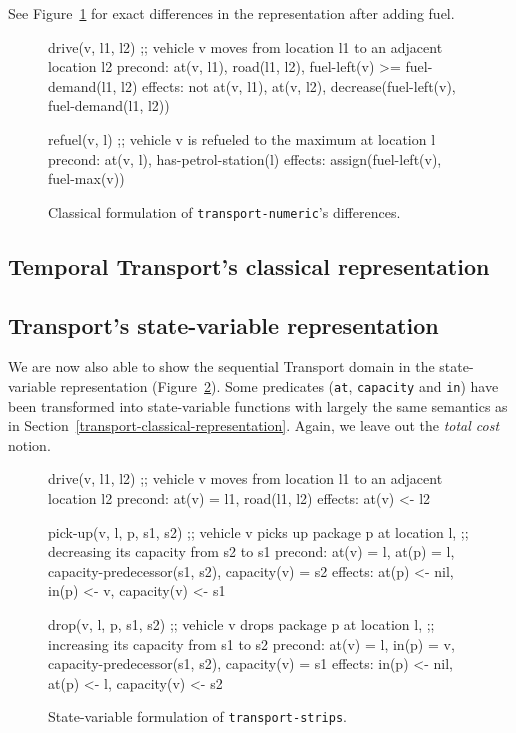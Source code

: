 See Figure~\ref{code:classical-numeric} for exact differences
in the representation after adding fuel.

\begin{figure}[htb]
\begin{code}
drive(v, l1, l2)
  ;; vehicle v moves from location l1 to an adjacent location l2
  precond: at(v, l1), road(l1, l2), fuel-left(v) >= fuel-demand(l1, l2)
  effects: not at(v, l1), at(v, l2),
           decrease(fuel-left(v),  fuel-demand(l1, l2))
  
refuel(v, l)
  ;; vehicle v is refueled to the maximum at location l
  precond: at(v, l), has-petrol-station(l)
  effects: assign(fuel-left(v), fuel-max(v))
\end{code}
\caption{Classical formulation of \texttt{transport-numeric}'s differences.}
\label{code:classical-numeric}
\end{figure}

\subsection{Temporal Transport's classical representation}


\subsection{Transport's state-variable representation}

We are now also able to show the sequential Transport domain
in the state-variable representation (Figure~\ref{code:statevar-strips}).
Some predicates (\verb+at+, \verb+capacity+ and \verb+in+) have been transformed
into state-variable functions with largely the same semantics as in
Section~\ref{transport-classical-representation}. Again, we leave out
the \textit{total cost} notion.

\begin{figure}[htb]
\begin{code}
drive(v, l1, l2)
  ;; vehicle v moves from location l1 to an adjacent location l2
  precond: at(v) = l1, road(l1, l2)
  effects: at(v) <- l2

pick-up(v, l, p, s1, s2)
  ;; vehicle v picks up package p at location l,
  ;; decreasing its capacity from s2 to s1
  precond: at(v) = l, at(p) = l, capacity-predecessor(s1, s2),
           capacity(v) = s2
  effects: at(p) <- nil, in(p) <- v, capacity(v) <- s1
  
drop(v, l, p, s1, s2)
  ;; vehicle v drops package p at location l,
  ;; increasing its capacity from s1 to s2
  precond: at(v) = l, in(p) = v, capacity-predecessor(s1, s2),
           capacity(v) = s1
  effects: in(p) <- nil, at(p) <- l, capacity(v) <- s2
\end{code}
\caption{State-variable formulation of \texttt{transport-strips}.}
\label{code:statevar-strips}
\end{figure}

